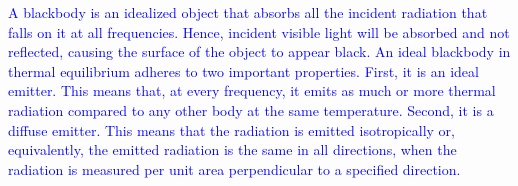 \documentclass[main.tex]{subfiles}
\begin{document}
\begin{tcolorbox}[sharp corners, colback=blue!30, colframe=blue!80!blue, title=Blackbody$^{11}$]
\par \textcolor{blue} {A blackbody is an idealized object that absorbs all the incident radiation that falls on it at all frequencies.  Hence, incident visible light will be absorbed and not reflected, causing the surface of the object to appear black.  An ideal blackbody in thermal equilibrium adheres to two important properties.  First, it is an ideal emitter.  This means that, at every frequency, it emits as much or more thermal radiation compared to any other body at the same temperature.  Second, it is a diffuse emitter.  This means that the radiation is emitted isotropically or, equivalently, the emitted radiation is the same in all directions, when the radiation is measured per unit area perpendicular to a specified direction.}
\end{tcolorbox}
\end{document}
